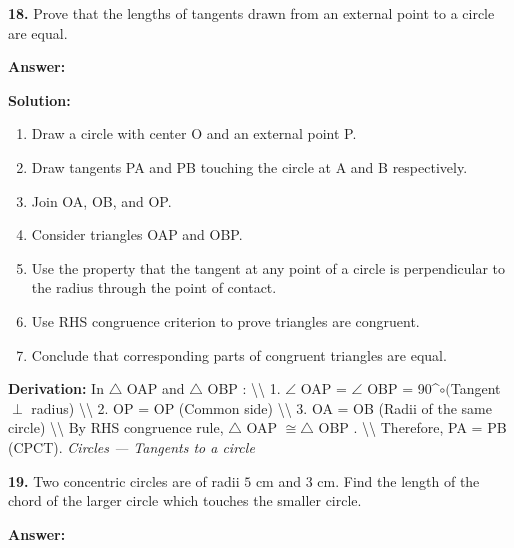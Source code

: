 \documentclass[12pt,a4paper]{exam}
\newcommand{\fitmath}[1]{%
  \sbox{\schmathbox}{$\displaystyle #1$}%
  \ifdim\wd\schmathbox>\linewidth
    \resizebox{\linewidth}{!}{\usebox{\schmathbox}}%
  \else
    \usebox{\schmathbox}%
  \fi}
\begin{document}
\begin{questions}
\question \textbf{18.} Prove that the lengths of tangents drawn from an external point to a circle are equal.

\textbf{Answer:}
\begin{center}
\fitmath{PA = PB}
\end{center}

\textbf{Solution:}
\begin{enumerate}
  \item Draw a circle with center O and an external point P.
  \item Draw tangents PA and PB touching the circle at A and B respectively.
  \item Join OA, OB, and OP.
  \item Consider triangles OAP and OBP.
  \item Use the property that the tangent at any point of a circle is perpendicular to the radius through the point of contact.
  \item Use RHS congruence criterion to prove triangles are congruent.
  \item Conclude that corresponding parts of congruent triangles are equal.
\end{enumerate}
\textbf{Derivation:}
In  $\triangle$ OAP  and  $\triangle$ OBP : \textbackslash{}\textbackslash{} 1.  $\angle$ OAP = $\angle$ OBP = 90\textasciicircum{}$\circ  ($Tangent  $\perp$  radius) \textbackslash{}\textbackslash{} 2.  OP = OP  (Common side) \textbackslash{}\textbackslash{} 3.  OA = OB  (Radii of the same circle) \textbackslash{}\textbackslash{} By RHS congruence rule,  $\triangle$ OAP $\cong \triangle$ OBP . \textbackslash{}\textbackslash{} Therefore,  PA = PB  (CPCT).
\hfill \textit{Circles — Tangents to a circle}
\vspace{0.3cm}

\question \textbf{19.} Two concentric circles are of radii $5\text{ cm}$ and $3\text{ cm}$. Find the length of the chord of the larger circle which touches the smaller circle.

\textbf{Answer:}
\begin{center}
\fitmath{8 cm}
\end{center}


\end{questions}
\end{document}
